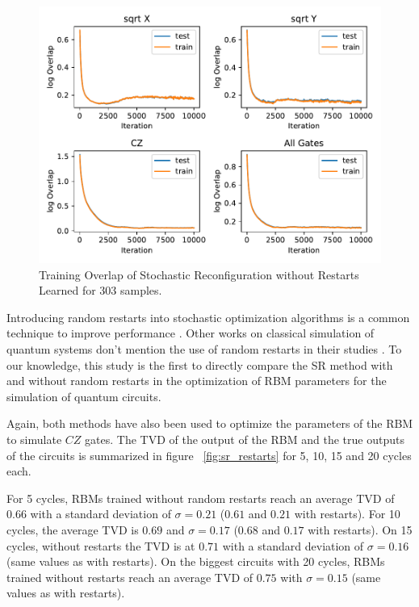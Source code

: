 \begin{figure}[H]
  \centering
  \includegraphics[width=\textwidth]{figures/results/SR-no-restarts-learned/avgOverlap_303.pdf}
  \caption[Training Overlap of Stochastic Reconfiguration without Restarts Learned]{Training 
  Overlap of Stochastic Reconfiguration without Restarts Learned for 303 samples.}
  \label{fig:sr_tvd}
\end{figure}

\iffalse
Introducing random restarts into stochastic optimization algorithms is a common technique to improve 
performance \cite{}. Other works on classical simulation of quantum systems don't mention the use
of random restarts in their studies \cite{}. To our knowledge, this study is the first to directly compare 
the SR method with and without random restarts in the optimization of RBM parameters 
for the simulation of quantum circuits.

Again, both methods have also been used to optimize the parameters of the RBM to simulate $CZ$ gates. 
The TVD of the output of the RBM and the true outputs of the circuits is summarized in 
figure ~\ref{fig:sr_restarts} for 5, 10, 15 and 20 cycles each.

For 5 cycles, RBMs trained without random restarts reach an average TVD of $0.66$ with a standard deviation of
$\sigma=0.21$ ($0.61$ and $0.21$ with restarts). For 10 cycles, the average TVD is $0.69$ and
$\sigma=0.17$ ($0.68$ and $0.17$ with restarts). On 15 cycles, without restarts the TVD is at $0.71$ with a standard deviation of $\sigma=0.16$
(same values as with restarts). On the biggest circuits with 20 cycles, RBMs trained without
restarts reach an average TVD of $0.75$ with $\sigma=0.15$ (same values as with restarts).

